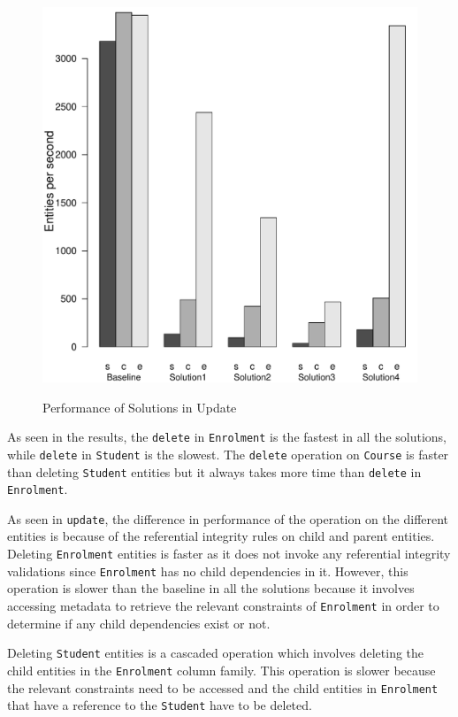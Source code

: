 \begin{figure}[H]
		{\includegraphics[width=\W]{figure/result/barplot-delete-tp.pdf} \label{fres:delete-}\label{fres:Delete-throughput}}
		\caption{Performance of Solutions in Update}\label{fres:Delete}
	\end{figure}
 
As seen in  the results, the \texttt{delete} in \texttt{Enrolment}
is the fastest in all the solutions, while  \texttt{delete} in
\texttt{Student} is the slowest. The \texttt{delete} operation on 
\texttt{Course} is faster than deleting \texttt{Student} entities but it
always takes more time than \texttt{delete} in \texttt{Enrolment}.

As seen in \texttt{update}, the difference in  performance of the operation
on the different entities is because of the referential integrity rules on
child and parent entities. Deleting \texttt{Enrolment} entities is faster as it 
does not invoke any referential integrity validations since \texttt{Enrolment}
has no child dependencies in it.
However, this operation is  slower than the baseline in all the solutions
because it involves accessing metadata to retrieve the relevant constraints of
\texttt{Enrolment} in order to determine if any child dependencies exist or
not.

Deleting \texttt{Student} entities is a cascaded operation which involves
deleting the child entities in the \texttt{Enrolment} column family. This
operation is slower because  the relevant constraints need to be  accessed and
the child entities in \texttt{Enrolment}  that have a reference to the
\texttt{Student} have to be deleted. 

